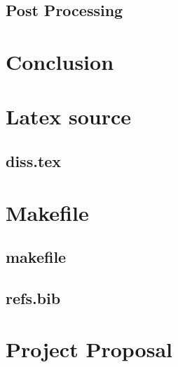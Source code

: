 \documentclass[12pt,a4paper,twoside,openright]{report}
\begin{document}
\section{Post Processing}

\chapter{Conclusion}




\appendix


\chapter{Latex source}

\section{diss.tex}
{\scriptsize}

\chapter{Makefile}

\section{makefile}\label{makefile}
{\scriptsize}

\section{refs.bib}
{\scriptsize}


\chapter{Project Proposal}


\end{document}

